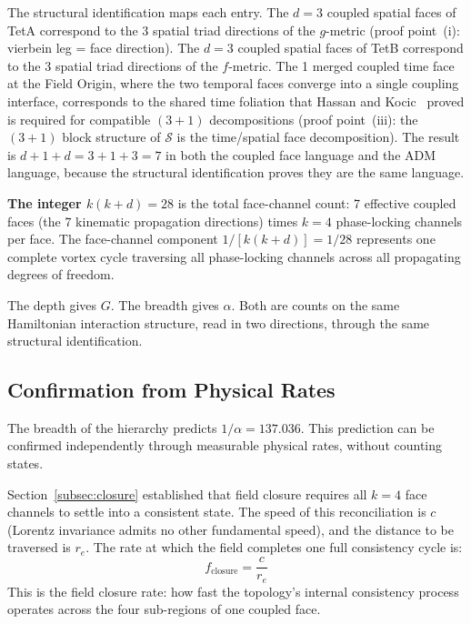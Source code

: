\documentclass[aps,prd,preprint,superscriptaddress,showpacs,preprintnumbers,amsmath,amssymb,nofootinbib]{revtex4-2}
\begin{document}
The structural identification maps each entry. The $d = 3$ coupled spatial faces of TetA correspond to the 3 spatial triad directions of the $g$-metric (proof point~(i): vierbein leg = face direction). The $d = 3$ coupled spatial faces of TetB correspond to the 3 spatial triad directions of the $f$-metric. The 1 merged coupled time face at the Field Origin, where the two temporal faces converge into a single coupling interface, corresponds to the shared time foliation that Hassan and Kocic~\cite{hassankocic2018} proved is required for compatible $(3{+}1)$ decompositions (proof point~(iii): the $(3{+}1)$ block structure of $\mathcal{S}$ is the time/spatial face decomposition). The result is $d + 1 + d = 3 + 1 + 3 = 7$ in both the coupled face language and the ADM language, because the structural identification proves they are the same language.

\textbf{The integer $k(k{+}d) = 28$} is the total face-channel count: 7 effective coupled faces (the 7 kinematic propagation directions) times $k = 4$ phase-locking channels per face. The face-channel component $1/[k(k{+}d)] = 1/28$ represents one complete vortex cycle traversing all phase-locking channels across all propagating degrees of freedom.

The depth gives $G$. The breadth gives $\alpha$. Both are counts on the same Hamiltonian interaction structure, read in two directions, through the same structural identification.

\subsection{Confirmation from Physical Rates}
\label{subsec:rates}

The breadth of the hierarchy predicts $1/\alpha = 137.036$. This prediction can be confirmed independently through measurable physical rates, without counting states.

Section~\ref{subsec:closure} established that field closure requires all $k = 4$ face channels to settle into a consistent state. The speed of this reconciliation is $c$ (Lorentz invariance admits no other fundamental speed), and the distance to be traversed is $r_e$. The rate at which the field completes one full consistency cycle is:
\begin{equation}
f_{\text{closure}} = \frac{c}{r_e}
\end{equation}
This is the field closure rate: how fast the topology's internal consistency process operates across the four sub-regions of one coupled face.
\end{document}
